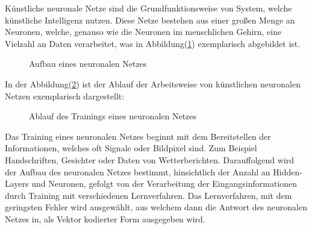 Künstliche neuronale Netze sind die Grundfunktionsweise von System, welche
künstliche Intelligenz nutzen. Diese Netze bestehen aus einer großen Menge an
Neuronen, welche, genauso wie die Neuronen im menschlichen Gehirn, eine
Vielzahl an Daten verarbeitet, was in Abbildung(\ref{fig:trainingneuronalesnetz}) exemplarisch abgebildet ist.
\begin{figure}[!h]
    \centering
    
    \caption[width=0.4\textwidth]{Aufbau eines neuronalen Netzes}
    \label{fig:trainingneuronalesnetz}
\end{figure}

In der Abbildung(\ref{fig:ablaufneuronalesnetz}) ist der Ablauf der
Arbeitsweise von künstlichen neuronalen Netzen exemplarisch dargestellt:
\begin{figure}[!h]
    \centering
    
    \caption[width=0.4\textwidth]{Ablauf des Trainings eines neuronalen Netzes}
    \label{fig:ablaufneuronalesnetz}
\end{figure}

Das Training eines neuronalen Netzes beginnt mit dem Bereitstellen der
Informationen, welches oft Signale oder Bildpixel sind. Zum Beispiel
Handschriften, Gesichter oder Daten von Wetterberichten. Darauffolgend wird der
Aufbau des neuronalen Netzes bestimmt, hinsichtlich der Anzahl an Hidden-Layers
und Neuronen, gefolgt von der Verarbeitung der Eingangsinformationen durch
Training mit verschiedenen Lernverfahren. Das Lernverfahren, mit dem geringsten
Fehler wird ausgewählt, aus welchem dann die Antwort des neuronalen Netzes in,
als Vektor kodierter Form ausgegeben wird.\cite{dorn2016programmieren}